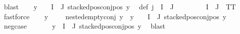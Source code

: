 \begin{isabellebody}
\ blast\isanewline
\ \ \isamarkupfalse%
\ {\isachardoublequoteopen}{\isacharparenleft}{\kern0pt}{\isasymforall}y\ {\isasymin}\ {\isacharparenleft}{\kern0pt}{\isasymPsi}\ {\isacharbackquote}{\kern0pt}\ {\isacharparenleft}{\kern0pt}I\ {\isasyminter}\ J{\isacharparenright}{\kern0pt}{\isacharparenright}{\kern0pt}{\isachardot}{\kern0pt}\ stacked{\isacharunderscore}{\kern0pt}pos{\isacharunderscore}{\kern0pt}conj{\isacharunderscore}{\kern0pt}pos\ y{\isacharparenright}{\kern0pt}{\isachardoublequoteclose}\ \isamarkupfalse%
\ {\isasymPsi}{\isacharunderscore}{\kern0pt}def\ {\isacartoucheopen}j\ {\isasymin}\ I\ {\isasyminter}\ J{\isacartoucheclose}\ \isanewline
\ \ \ \ \isamarkupfalse%
\ {\isacartoucheopen}{\isasymPsi}\ {\isacharbackquote}{\kern0pt}\ {\isacharparenleft}{\kern0pt}I\ {\isasyminter}\ J{\isacharparenright}{\kern0pt}\ {\isacharequal}{\kern0pt}\ {\isacharbraceleft}{\kern0pt}TT{\isacharbraceright}{\kern0pt}{\isacartoucheclose}\ \isamarkupfalse%
\ fastforce\isanewline
\ \ \isamarkupfalse%
\ {\isachardoublequoteopen}{\isacharparenleft}{\kern0pt}{\isasymforall}y\ {\isasymin}\ {\isacharparenleft}{\kern0pt}{\isasymPsi}\ {\isacharbackquote}{\kern0pt}\ {\isacharbraceleft}{\kern0pt}{\isacharbraceright}{\kern0pt}{\isacharparenright}{\kern0pt}{\isachardot}{\kern0pt}\ nested{\isacharunderscore}{\kern0pt}empty{\isacharunderscore}{\kern0pt}conj\ y{\isacharparenright}{\kern0pt}\ {\isasymand}\ {\isacharparenleft}{\kern0pt}{\isasymforall}y\ {\isasymin}\ {\isacharparenleft}{\kern0pt}{\isasymPsi}\ {\isacharbackquote}{\kern0pt}\ {\isacharparenleft}{\kern0pt}I\ {\isasyminter}\ J{\isacharparenright}{\kern0pt}{\isacharparenright}{\kern0pt}{\isachardot}{\kern0pt}\ stacked{\isacharunderscore}{\kern0pt}pos{\isacharunderscore}{\kern0pt}conj{\isacharunderscore}{\kern0pt}pos\ y{\isacharparenright}{\kern0pt}{\isachardoublequoteclose}\ \isanewline
\ \ \ \ \isamarkupfalse%
\ neg{\isacharunderscore}{\kern0pt}case\ \isanewline
\ \ \ \ \isamarkupfalse%
\ {\isacartoucheopen}{\isasymforall}y{\isasymin}{\isasymPsi}\ {\isacharbackquote}{\kern0pt}\ {\isacharparenleft}{\kern0pt}I\ {\isasyminter}\ J{\isacharparenright}{\kern0pt}{\isachardot}{\kern0pt}\ stacked{\isacharunderscore}{\kern0pt}pos{\isacharunderscore}{\kern0pt}conj{\isacharunderscore}{\kern0pt}pos\ y{\isacartoucheclose}\ \isamarkupfalse%
\ blast\isanewline
\ \ \isamarkupfalse%

\end{isabellebody}
